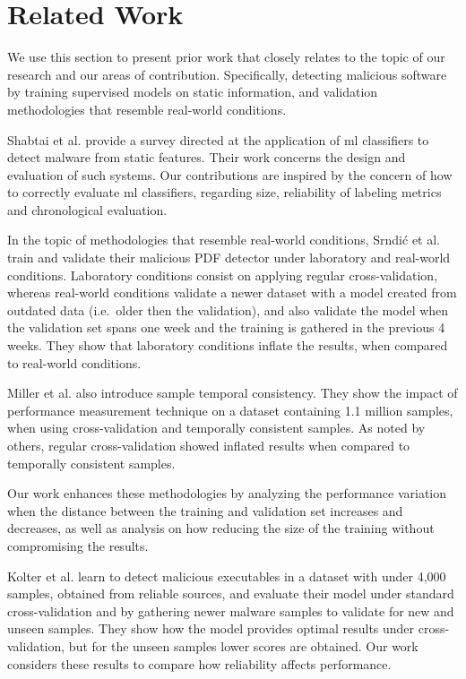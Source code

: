 
\section{Related Work}\label{sec:related}

We use this section to present prior work that closely relates to the topic of our research and our areas of contribution. Specifically, detecting malicious software by training supervised models on static information, and validation methodologies that resemble real-world conditions.

Shabtai et al.\cite{shabtai:survey} provide a survey directed
at the application of \gls{ml} classifiers to detect malware from static
features. Their work concerns the design and evaluation of such systems. Our contributions are inspired by the concern of how to correctly evaluate \gls{ml} classifiers, regarding size, reliability of labeling metrics and chronological evaluation.

In the topic of methodologies that resemble real-world conditions, Srndi\'c et al.\cite{vsrndic2013detection}
train and validate their malicious PDF detector under laboratory and real-world conditions. Laboratory conditions consist on applying regular cross-validation, whereas real-world conditions validate a newer dataset with a model created from outdated data (i.e.\ older then the validation), and also validate the model when the validation set spans one week and the training is gathered in the previous 4 weeks. They show that laboratory conditions inflate the results, when compared to real-world conditions.

Miller et al.\cite{miller:rev_int} also introduce sample temporal consistency. They show the impact of performance measurement technique on a dataset containing 1.1 million samples, when using cross-validation and temporally consistent samples. As noted by others, regular cross-validation showed inflated results when compared to temporally consistent samples.

Our work enhances these methodologies by analyzing the performance variation when the distance between the training and validation set increases and decreases, as well as analysis on how reducing the size of the training without compromising the results.

Kolter et al.\cite{kolter:learning} learn to detect malicious executables in a dataset with under 4,000 samples, obtained from reliable sources, and evaluate their model under standard cross-validation and by gathering newer malware samples to validate for new and unseen samples. They show how the model provides optimal results under cross-validation, but for the unseen samples lower scores are obtained. Our work considers these results to compare how reliability affects performance.

